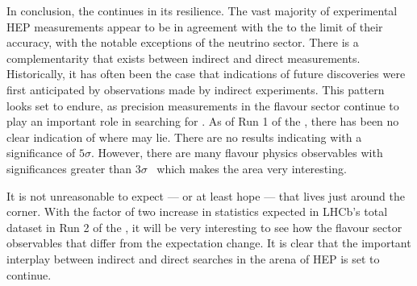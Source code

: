 In conclusion, the \sm continues in its resilience.
The vast majority of experimental \gls{HEP} measurements appear to be in agreement with the \sm to
the limit of their accuracy, with the notable exceptions of the neutrino sector.
There is a complementarity that exists between indirect and direct measurements.
Historically, it has often been the case that indications of future discoveries were first
anticipated by observations made by indirect experiments.
This pattern looks set to endure,
as precision measurements in the flavour sector continue to play an important role in searching for
\np.
As of Run 1 of the \lhc, there has been no clear indication of where \np may lie.
There are no results indicating \np with a significance of $5\sigma$.
However, there are many flavour physics observables with significances greater than
$3\sigma$~\cite{LHCb-CONF-2015-002,LHCb-PAPER-2015-025,Lees:2013uzd,Lees:2012xj,Bozek:2010xy,LHCb-PAPER-2014-024,LHCb-PAPER-2015-023}
which makes the area very interesting.

It is not unreasonable to expect --- or at least hope --- that \np lives just
around the corner.
With the factor of two increase in statistics expected in LHCb's total dataset in Run 2 of the
\lhc, it will be very interesting to see how the flavour sector observables that differ from the
\sm expectation change.
It is clear that the important interplay between indirect and direct searches in the arena of
\gls{HEP} is set to continue.


